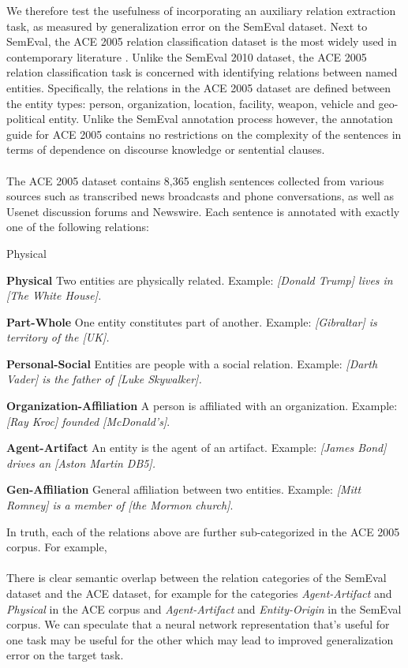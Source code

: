 We therefore test the usefulness of incorporating an auxiliary relation extraction task, as measured by generalization error on the SemEval dataset. Next to SemEval, the ACE 2005 relation classification dataset is the most widely used in contemporary literature  \citep{walker2006}. Unlike the SemEval 2010 dataset, the ACE 2005 relation classification task is concerned with identifying relations between named entities. Specifically, the relations in the ACE 2005 dataset are defined between the entity types: person, organization, location, facility, weapon, vehicle and geo-political entity. Unlike the SemEval annotation process however, the annotation guide for ACE 2005  contains no restrictions on the complexity of the sentences in terms of dependence on discourse knowledge or sentential clauses.
\\\\
The ACE 2005 dataset contains 8,365 english sentences collected from various sources such as transcribed news broadcasts and phone conversations, as well as Usenet discussion forums and Newswire. Each sentence is annotated with exactly one of the following relations:
\begin{labeling}{Physical}
	\item \textbf{Physical} Two entities are physically related. Example: \textit{[Donald Trump] lives in [The White House].}
	\item \textbf{Part-Whole} One entity constitutes part of another. Example: \textit{[Gibraltar] is territory of the [UK].}
	\item \textbf{Personal-Social} Entities are people with a social relation. Example: \textit{[Darth Vader] is the father of [Luke Skywalker].}
	\item \textbf{Organization-Affiliation} A person is affiliated with an organization. Example: \textit{[Ray Kroc] founded [McDonald's]}.
	\item \textbf{Agent-Artifact} An entity is the agent of an artifact. Example: \textit{[James Bond] drives an [Aston Martin DB5].}
	\item \textbf{Gen-Affiliation} General affiliation between two entities. Example: \textit{[Mitt Romney] is a member of [the Mormon church]}.
\end{labeling}
In truth, each of the relations above are further sub-categorized in the ACE 2005 corpus. For example, 
\\\\
There is clear semantic overlap between the relation categories of the SemEval dataset and the ACE dataset, for example for the categories \textit{Agent-Artifact} and \textit{Physical} in the ACE corpus and \textit{Agent-Artifact} and \textit{Entity-Origin} in the SemEval corpus. We can speculate that a neural network representation that's useful for one task may be useful for the other which may lead to improved generalization error on the target task. 

